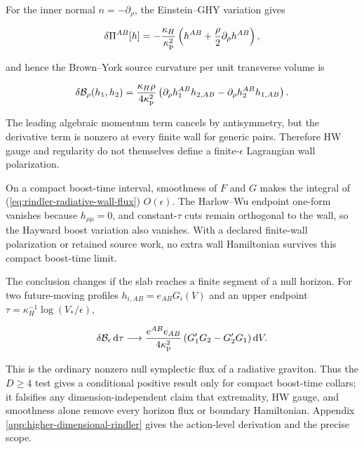 For the inner normal $n=-\partial_\rho$, the Einstein--GHY variation gives

\begin{align}
\delta\Pi^{AB}[h]
=-\frac{\kappa_H}{\kappa_{\rm p}^2}
\left(h^{AB}+\frac\rho2\partial_\rho h^{AB}\right),
\end{align}

and hence the Brown--York source curvature per unit transverse volume is

\begin{align}
\delta\mathcal B_\rho(h_1,h_2)
=\frac{\kappa_H\rho}{4\kappa_{\rm p}^2}
\left(
\partial_\rho h_1^{AB}h_{2,AB}
-\partial_\rho h_2^{AB}h_{1,AB}
\right).
\label{eq:rindler-radiative-wall-flux}
\end{align}

The leading algebraic momentum term cancels by antisymmetry, but the derivative term is nonzero at every finite wall for generic pairs. Therefore HW gauge and regularity do not themselves define a finite-$\epsilon$ Lagrangian wall polarization.

On a compact boost-time interval, smoothness of $F$ and $G$ makes the integral of (\ref{eq:rindler-radiative-wall-flux}) $O(\epsilon)$. The Harlow--Wu endpoint one-form vanishes because $h_{\rho\mu}=0$, and constant-$\tau$ cuts remain orthogonal to the wall, so the Hayward boost variation also vanishes. With a declared finite-wall polarization or retained source work, no extra wall Hamiltonian survives this compact boost-time limit.

The conclusion changes if the slab reaches a finite segment of a null horizon. For two future-moving profiles $h_{i,AB}=e_{AB}G_i(V)$ and an upper endpoint $\tau=\kappa_H^{-1}\log(V_*/\epsilon)$,

\begin{align}
\delta\mathcal B_\epsilon\,\mathrm d\tau
\longrightarrow
\frac{e^{AB}e_{AB}}{4\kappa_{\rm p}^2}
\left(G_1'G_2-G_2'G_1\right)\mathrm dV .
\label{eq:rindler-null-flux}
\end{align}

This is the ordinary nonzero null symplectic flux of a radiative graviton. Thus the $D\geq4$ test gives a conditional positive result only for compact boost-time collars; it falsifies any dimension-independent claim that extremality, HW gauge, and smoothness alone remove every horizon flux or boundary Hamiltonian. Appendix \ref{app:higher-dimensional-rindler} gives the action-level derivation and the precise scope.
